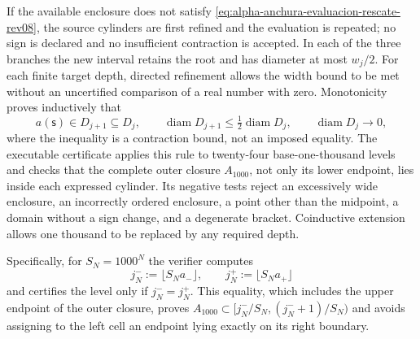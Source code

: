 If the available enclosure does not satisfy
\eqref{eq:alpha-anchura-evaluacion-rescate-rev08}, the source cylinders
are first refined and the evaluation is repeated; no sign is declared and no
insufficient contraction is accepted. In each of the three branches the new
interval retains the root and has diameter at most \(w_j/2\). For each
finite target depth, directed refinement allows the width
bound to be met without an uncertified comparison of a real number with zero.
Monotonicity proves inductively that
\begin{equation}
 a(\mathsf s)\in D_{j+1}\subseteq D_j,\qquad
 \operatorname{diam}D_{j+1}\leq
 \tfrac12\operatorname{diam}D_j,
 \qquad \operatorname{diam}D_j\longrightarrow0,
 \label{eq:alpha-biseccion-racional}
\end{equation}
where the inequality is a contraction bound, not an imposed equality.
The executable certificate applies
this rule to twenty-four base-one-thousand levels and checks that the complete
outer closure \(A_{1000}\), not only its lower endpoint, lies inside
each expressed cylinder. Its negative tests reject an excessively wide
enclosure, an incorrectly ordered enclosure, a point other than the midpoint, a domain without
a sign change, and a degenerate bracket. Coinductive extension allows
one thousand to be replaced by any required depth.

Specifically, for \(S_N=1000^N\) the verifier computes
\begin{equation}
 j_N^-:=\lfloor S_Na_-\rfloor,
 \qquad j_N^+:=\lfloor S_Na_+\rfloor
 \label{eq:alpha-indices-cilindro-dirigidos-rev08}
\end{equation}
and certifies the level only if \(j_N^-=j_N^+\). This equality, which includes the
upper endpoint of the outer closure, proves
\(A_{1000}\subset[j_N^-/S_N,(j_N^-+1)/S_N)\) and avoids assigning to the left
cell an endpoint lying exactly on its right boundary.

